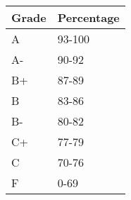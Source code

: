 \documentclass[10pt]{article}
\begin{document}
\clearpage
{ 
\bigskip
{}
\begin{table}[htp]
\begin{tabular}{ll}
Grade & Percentage \\
\hline
A & 93-100 \\
A- & 90-92 \\
B+ & 87-89 \\
B & 83-86 \\
B- & 80-82 \\
C+ & 77-79 \\
C & 70-76 \\
F & 0-69 \\
\end{tabular}
\end{table}%
  }
  
\end{document}
